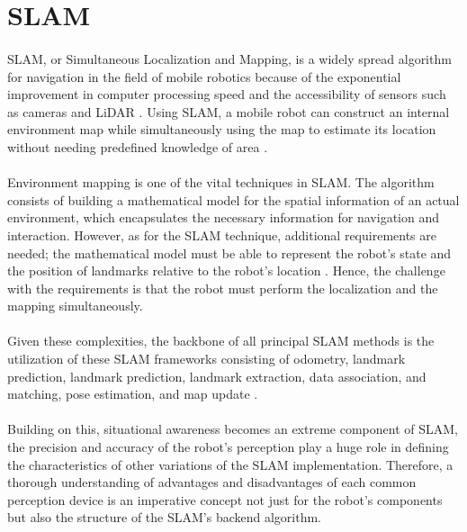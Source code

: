 \section{SLAM}

\paragraph*{}
SLAM, or Simultaneous Localization and Mapping, is a widely spread algorithm for navigation in the field of mobile robotics because of the exponential improvement in computer processing speed and the accessibility of sensors such as cameras and LiDAR \cite{barbadekar2023exploring}. Using SLAM, a mobile robot can construct an internal environment map while simultaneously using the map to estimate its location without needing predefined knowledge of area \cite{durrant2006simultaneous}.

\paragraph*{}
Environment mapping is one of the vital techniques in SLAM. The algorithm consists of building a mathematical model for the spatial information of an actual environment, which encapsulates the necessary information for navigation and interaction. However, as for the SLAM technique, additional requirements are needed; the mathematical model must be able to represent the robot’s state and the position of landmarks relative to the robot’s location \cite{durrant2006simultaneous}. Hence, the challenge with the requirements is that the robot must perform the localization and the mapping simultaneously.

\paragraph*{}
Given these complexities, the backbone of all principal SLAM methods is the utilization of these SLAM frameworks consisting of odometry, landmark prediction, landmark prediction, landmark extraction, data association, and matching, pose estimation, and map update \cite{chong2015sensor}.

\paragraph*{}
Building on this, situational awareness becomes an extreme component of SLAM, the precision and accuracy of the robot's perception play a huge role in defining the characteristics of other variations of the SLAM implementation. Therefore, a thorough understanding of advantages and disadvantages of each common perception device is an imperative concept not just for the robot’s components but also the structure of the SLAM’s backend algorithm. 


